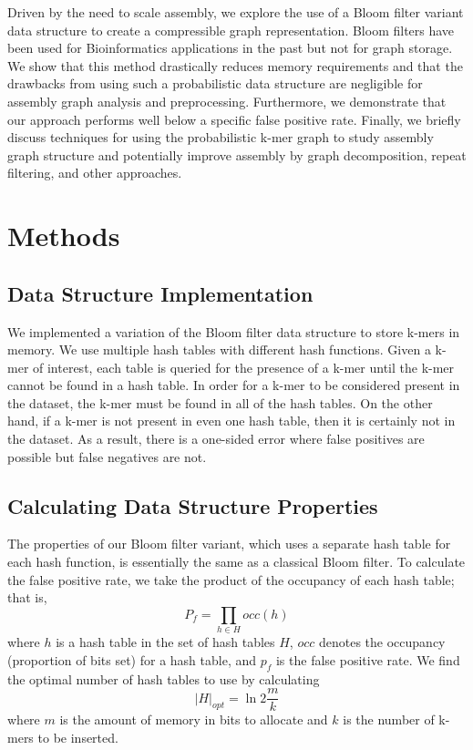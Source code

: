 \documentclass[12pt]{article} \usepackage{simplemargins}
\begin{document}
Driven by the need to scale assembly, we explore the use of a 
Bloom filter variant data structure to create a compressible graph 
representation. Bloom filters\cite{bloom} have been used for 
Bioinformatics applications 
in the past\cite{pmid20472541, haskell, pmid20426693} but not for graph 
storage. We show that this method drastically
reduces memory requirements and that the drawbacks from using such a 
probabilistic data structure are negligible for assembly graph 
analysis and preprocessing. Furthermore, we demonstrate that our 
approach performs well below a specific false positive rate. Finally, we 
briefly discuss techniques for using the probabilistic k-mer graph 
to study assembly graph structure and potentially improve assembly by 
graph decomposition, repeat filtering, and other approaches.

\section{Methods}

\subsection{Data Structure Implementation}
We implemented a variation of the Bloom filter data structure to store k-mers
in memory. We use multiple hash tables with different hash functions. 
Given a k-mer of interest, each table is queried for the
presence of a k-mer until the k-mer cannot be found in a hash
table. In order for a k-mer to be considered present in the dataset, 
the k-mer must be found in all of the hash tables. On the other hand, 
if a k-mer is not present in even one hash table, then it is certainly 
not in the dataset. As a result, there is a one-sided error where 
false positives are possible but false negatives are not.

\subsection{Calculating Data Structure Properties}
The properties of our Bloom filter variant, which 
uses a separate hash table for each hash function, is essentially the 
same as a classical Bloom filter. To calculate the false positive rate, we 
take the product of the occupancy of each hash table; that is,
\begin{displaymath}
P_f = \prod_{h \in H} occ(h)
\end{displaymath}
where $h$ is a hash table in the set of hash tables $H$, $occ$ denotes 
the occupancy (proportion of bits set) for a hash table, and $p_f$ is 
the false positive rate. We find the optimal number of hash tables 
to use by calculating
\begin{displaymath}
\vert H \vert_{opt} = \ln 2 \frac{m}{k}
\end{displaymath}
where $m$ is the amount of memory in bits to allocate and $k$ 
is the number of k-mers to be inserted.
\end{document}
